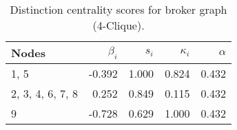 \begin{table}
\centering
\caption{\label{tab:b4}Distinction centrality scores for broker graph (4-Clique).}
\centering
\begin{tabular}[t]{lrrrr}
\toprule
Nodes & $\beta_i$ & $s_i$ & $\kappa_i$ & $\alpha$\\
\midrule
1, 5 & -0.392 & 1.000 & 0.824 & 0.432\\
2, 3, 4, 6, 7, 8 & 0.252 & 0.849 & 0.115 & 0.432\\
9 & -0.728 & 0.629 & 1.000 & 0.432\\
\bottomrule
\end{tabular}
\end{table}
